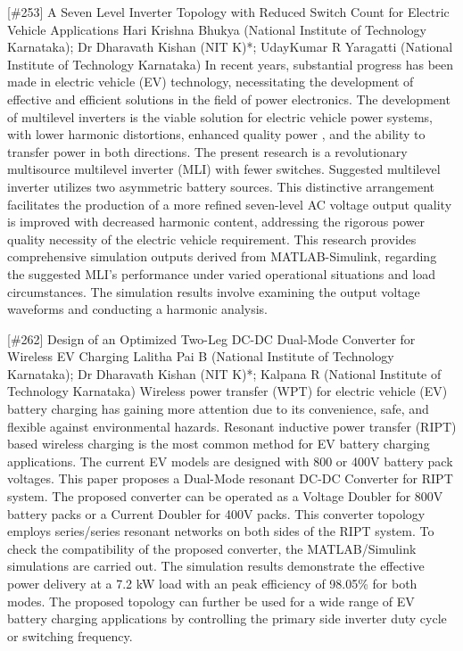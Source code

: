 {} \begin{abstract_online} {[\#253] A Seven Level Inverter Topology with Reduced  Switch Count for Electric Vehicle Applications} {} {Hari Krishna Bhukya (National Institute of Technology Karnataka); Dr Dharavath  Kishan (NIT K)*; UdayKumar R Yaragatti (National Institute of Technology Karnataka)} {} In recent years, substantial progress has been made in electric vehicle (EV) technology, necessitating the development  of effective and efficient solutions in the field of power electronics.  The development of multilevel inverters is the viable solution for  electric vehicle power systems, with lower harmonic distortions, enhanced quality power , and the ability to transfer power in both directions. The present research is a revolutionary multisource multilevel inverter (MLI) with fewer switches. Suggested multilevel inverter utilizes two asymmetric battery sources. This distinctive arrangement facilitates the production of a more refined seven-level AC voltage output quality is improved with decreased harmonic content, addressing the rigorous power quality necessity of the electric vehicle requirement. This research provides comprehensive simulation outputs derived from MATLAB-Simulink, regarding the suggested MLI's performance under varied operational situations and load circumstances. The simulation results involve examining the output voltage waveforms and conducting a harmonic analysis. \end{abstract_online} 
{} \begin{abstract_online} {[\#262] Design of an Optimized Two-Leg DC-DC Dual-Mode Converter for Wireless EV Charging} {} {Lalitha Pai B (National Institute of Technology Karnataka); Dr Dharavath  Kishan (NIT K)*; Kalpana R (National Institute of Technology Karnataka)} {} Wireless power transfer (WPT) for electric vehicle (EV) battery charging has gaining more attention due to its convenience, safe, and flexible against environmental hazards. Resonant inductive power transfer (RIPT) based wireless charging is the most common method for EV battery charging applications. The current EV models are designed with 800 or 400V battery pack voltages. This paper proposes a Dual-Mode resonant DC-DC Converter for RIPT system. The proposed converter can be operated as a Voltage Doubler for 800V battery packs or a Current Doubler for 400V packs. This converter topology employs series/series resonant networks on both sides of the RIPT system. To check the compatibility of the proposed converter, the MATLAB/Simulink simulations are carried out.  The simulation results demonstrate the effective power delivery at a 7.2 kW load with an peak efficiency of 98.05\% for both modes. The proposed topology can further be used for a wide range of EV battery charging applications by controlling the primary side inverter duty cycle or switching frequency. \end{abstract_online} 
